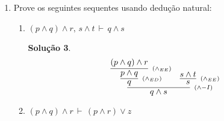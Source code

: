 \documentclass[11pt,a4paper]{report}
\newtheorem*{Solucao}{Solu\c{c}\~ao}
\newcommand{\F}{$F$}
\newcommand{\T}{$T$}
\begin{document}
\begin{enumerate}
\begin{enumerate}
\begin{Solucao}
                    S\~ao equivalentes.
                  \end{Solucao}
                  
		\item $(P\land\neg Q)\lor (\neg P\land Q)$ e $(P\lor
                  Q)\land\neg(P\land Q)$
                  \begin{Solucao}
                    \verb| |\\
                    \begin{tabular}{|c|c|c|}
                      \hline
                      $P$ & $Q$ & $[(P\land\neg Q)\lor (\neg P\land Q)]\leftrightarrow[(P\lor
                  Q)\land\neg(P\land Q)]$ \\ \hline
                  \F & \F & \T \\
                  \F & \T & \T \\
                  \T & \F & \T \\
                  \T & \T & \T \\ \hline
                    \end{tabular}

                    S\~ao equivalentes.
                  \end{Solucao}
	\end{enumerate}	      
	\item Prove os seguintes sequentes usando dedu\c{c}\~ao natural:
	\begin{enumerate}
		\item $(p\land q)\land r,\, s\land t\,\vdash\,q\land
                  s$
                  \begin{Solucao}
                    \[
                    \infer[\scriptstyle{(\land-I)}]
                            {q \land s}
                            {
                              \infer[\scriptstyle{(\land_{ED})}]
                                      {q}
                                      {
                                        \infer[\scriptstyle{(\land_{EE})}]
                                                 {p\land q}
                                                 {(p\land q)\land r}
                                      }
                                      & 
                                \infer[\scriptstyle{(\land_{EE})}]
                                         {s}
                                         {s \land t}
                            }
                    \]
                    \end{Solucao}
		\item $(p\land q)\land r\,\vdash\,(p\land r)\lor z$


\end{enumerate}
\end{enumerate}
\end{document}
